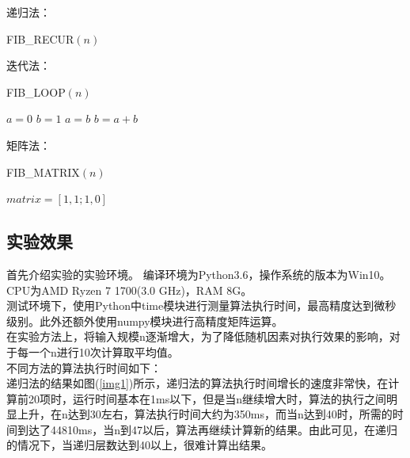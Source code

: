 \documentclass[UTF8]{ctexart}
\begin{document}
递归法：
\begin{algorithm}[H]
	\caption{FIB\_RECUR$(n)$}%
    \begin{algorithmic}[1]%
        \ENDIF
	\end{algorithmic}
\end{algorithm}

迭代法：
\begin{algorithm}[H]
	\caption{FIB\_LOOP$(n)$}%
	\begin{algorithmic}[1]%
        \STATE $a = 0$
        \STATE $b = 1$
		\STATE $a = b$
		\STATE $b = a + b$
        \ENDFOR
	\end{algorithmic}
\end{algorithm}

矩阵法：
\begin{algorithm}[H]
	\caption{FIB\_MATRIX$(n)$}%
	\begin{algorithmic}[1]%
		\STATE $matrix = [1,1 ; 1,0]$
	\end{algorithmic}
\end{algorithm}


\subsection{实验效果}
首先介绍实验的实验环境。
编译环境为Python3.6，操作系统的版本为Win10。
CPU为AMD Ryzen 7 1700(3.0 GHz)，RAM 8G。\\
测试环境下，使用Python中time模块进行测量算法执行时间，最高精度达到微秒级别。此外还额外使用numpy模块进行高精度矩阵运算。\\
在实验方法上，将输入规模n逐渐增大，为了降低随机因素对执行效果的影响，对于每一个n进行10次计算取平均值。\\

不同方法的算法执行时间如下：\\
递归法的结果如图(\ref{img1})所示，递归法的算法执行时间增长的速度非常快，在计算前20项时，运行时间基本在1ms以下，但是当n继续增大时，算法的执行之间明显上升，在n达到30左右，算法执行时间大约为350ms，而当n达到40时，所需的时间到达了44810ms，当n到47以后，算法再继续计算新的结果。由此可见，在递归的情况下，当递归层数达到40以上，很难计算出结果。\\
\end{document}
